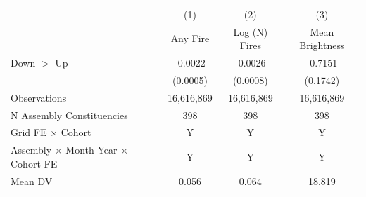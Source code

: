 \begin{tabular}{lccc}
\tabularnewline \hline
& (1) & (2) & (3)\\
& Any Fire & Log (N) Fires & Mean Brightness\\
\hline

Down $>$ Up &     -0.0022\sym{***}&     -0.0026\sym{***}&     -0.7151\sym{***}\\
            &    (0.0005)         &    (0.0008)         &    (0.1742)         \\
\hline
Observations&  16,616,869         &  16,616,869         &  16,616,869         \\
N Assembly Constituencies&         398         &         398         &         398         \\
Grid FE $\times$ Cohort&           Y         &           Y         &           Y         \\
Assembly $\times$ Month-Year $\times$ Cohort FE&           Y         &           Y         &           Y         \\
Mean DV     &       0.056         &       0.064         &      18.819         \\
\hline
\end{tabular}
